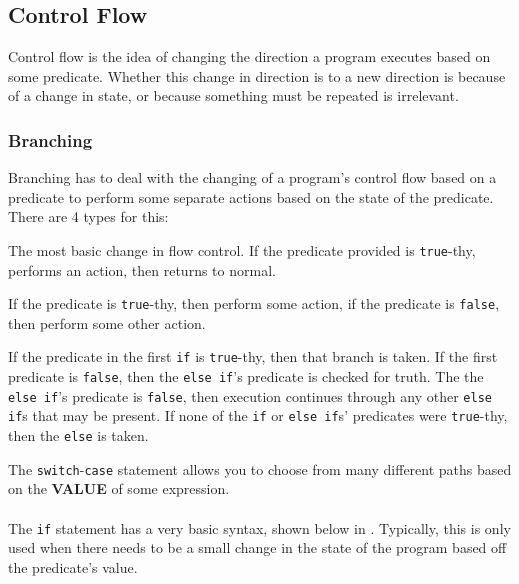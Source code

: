 \subsection{Control Flow}\label{subsec:Control_Flow}
Control flow is the idea of changing the direction a program executes based on some predicate.
Whether this change in direction is to a new direction is because of a change in state, or because something must be repeated is irrelevant.

\subsubsection{Branching}\label{subsubsec:Branching}
Branching has to deal with the changing of a program's control flow based on a predicate to perform some separate actions based on the state of the predicate.
There are 4 types for this:
\begin{description}[noitemsep]
\item[\nameref{par:if_Statement}] The most basic change in flow control.
  If the predicate provided is \texttt{true}-thy, performs an action, then returns to normal.

\item[\nameref{par:if_else_Statement}] If the predicate is \texttt{true}-thy, then perform some action, if the predicate is \texttt{false}, then perform some other action.

\item[\nameref{par:if_elseif_else_Statement}] If the predicate in the first \texttt{if} is \texttt{true}-thy, then that branch is taken.
  If the first predicate is \texttt{false}, then the \texttt{else if}'s predicate is checked for truth.
  The the \texttt{else if}'s predicate is \texttt{false}, then execution continues through any other \texttt{else if}s that may be present.
  If none of the \texttt{if} or \texttt{else if}s' predicates were \texttt{true}-thy, then the \texttt{else} is taken.
\item[\nameref{par:switch_case_Statement}] The \texttt{switch}-\texttt{case} statement allows you to choose from many different paths based on the \textbf{VALUE} of some expression.
\end{description}

\paragraph{\texorpdfstring{}{\texttt{if}}}\label{par:if_Statement}
The \texttt{if} statement has a very basic syntax, shown below in .
Typically, this is only used when there needs to be a small change in the state of the program based off the predicate's value.

